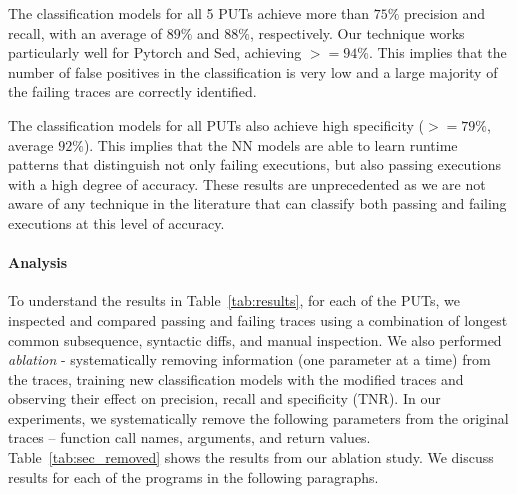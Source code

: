 The classification models for all 5 PUTs achieve more than $75\%$ precision and recall, with an average of $89\%$ and $88\%$, respectively. Our technique works particularly well for Pytorch and Sed, achieving $>=94\%$. This implies that the number of false positives in the classification is very low and a large majority of the failing traces are correctly identified. 

The classification models for all PUTs also achieve high specificity ($> = 79\%$, average $92\%$). This implies that the NN models are able to learn runtime patterns that distinguish not only failing executions, but also passing executions with a high degree of accuracy. These results are unprecedented as we are not aware of any technique in the literature that can classify both passing and failing executions at this level of accuracy.

\paragraph{Analysis}
To understand the results in Table~\ref{tab:results}, for each of the PUTs, we inspected and compared passing and failing traces using a combination of longest common subsequence, syntactic diffs, and manual inspection. We also performed \emph{ablation} - systematically removing information (one parameter at a time) from the traces, training new classification models with the modified traces and observing their effect on precision, recall and specificity (TNR). In our experiments, we systematically remove the following parameters from the original traces -- function call names, arguments, and return values. Table~\ref{tab:sec_removed} shows the results from our ablation study.
We discuss results for each of the programs in the following paragraphs. 

